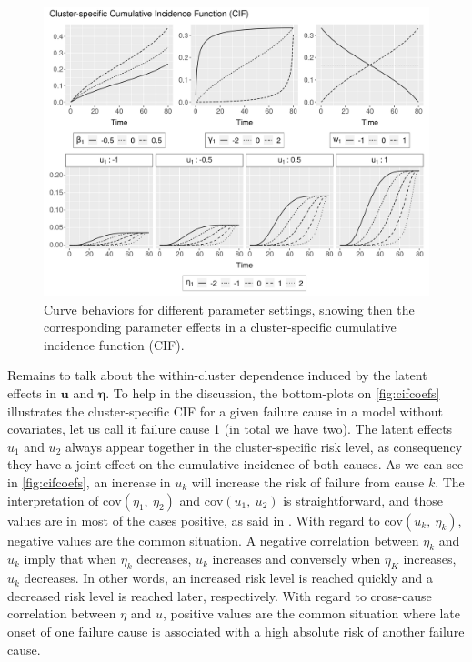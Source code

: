 \documentclass[a4paper,12pt]{article}
\begin{document}
\begin{figure}[H]
 \centering \includegraphics[width=\linewidth]{pics/cifstudy-1.png}
 \vspace{-0.75cm}
 \caption{Curve behaviors for different parameter settings, showing then
   the corresponding parameter effects in a cluster-specific cumulative
   incidence function (CIF).}
 \label{fig:cifcoefs}
\end{figure}

Remains to talk about the within-cluster dependence induced by the
latent effects in \(\bm{u}\) and \(\bm{\eta}\). To help in the
discussion, the bottom-plots on \autoref{fig:cifcoefs} illustrates the
cluster-specific CIF for a given failure cause in a model without
covariates, let us call it failure cause 1 (in total we have two). The
latent effects \(u_{1}\) and \(u_{2}\) always appear together in the
cluster-specific risk level, as consequency they have a joint effect on
the cumulative incidence of both causes. As we can see in
\autoref{fig:cifcoefs}, an increase in \(u_{k}\) will increase the risk
of failure from cause \(k\). The interpretation of
\(\text{cov}(\eta_{1},~\eta_{2})\) and \(\text{cov}(u_{1},~u_{2})\) is
straightforward, and those values are in most of the cases positive, as
said in \cite{SCHEIKE}. With regard to \(\text{cov}(u_{k},~\eta_{k})\),
negative values are the common situation. A negative correlation between
\(\eta_{k}\) and \(u_{k}\) imply that when \(\eta_{k}\) decreases,
\(u_{k}\) increases and conversely when \(\eta_{K}\) increases,
\(u_{k}\) decreases. In other words, an increased risk level is reached
quickly and a decreased risk level is reached later, respectively. With
regard to cross-cause correlation between \(\eta\) and \(u\), positive
values are the common situation where late onset of one failure cause is
associated with a high absolute risk of another failure cause.
\end{document}
